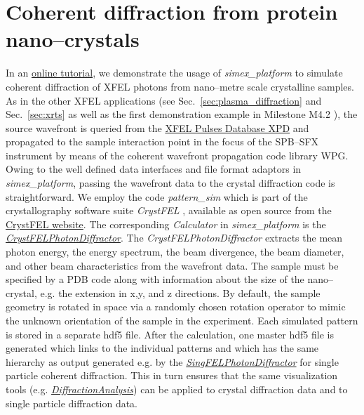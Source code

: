 \documentclass[10pt]{scrartcl}
\begin{document}
\section{Coherent diffraction from protein nano--crystals\label{sec:protein_sfx}}
In an
\href{https://github.com/eucall-software/simex_platform/wiki/Tutorial-on-nano-crystal-diffraction}{online
tutorial}, we demonstrate the usage of \textit{simex\_platform} to simulate
coherent diffraction of XFEL photons from nano--metre scale crystalline samples.
As in the other XFEL applications (see Sec.~\ref{sec:plasma_diffraction} and
Sec.~\ref{sec:xrts} as well as the first demonstration example in Milestone
M4.2 \cite{EUCALL_SIMEX_M4.2}), the source wavefront is queried from the
\href{https://in.xfel.eu/xpd}{XFEL Pulses Database XPD} and propagated to the
sample interaction point in the focus of the SPB--SFX instrument by means of
the coherent wavefront propagation code library WPG. Owing to the well defined
data interfaces and file format adaptors in \textit{simex\_platform}, passing the
wavefront data to the crystal diffraction code is straightforward. We employ the
code \textit{pattern\_sim} which is part of the crystallography software suite
\textit{CrystFEL} \cite{White2012}, available as open source from the
\href{https://www.desy.de/~twhite/crystfel}{CrystFEL website}. The
corresponding \textit{Calculator} in \textit{simex\_platform} is the
\href{https://eucall-software.github.io/simex_platform/#SimEx.Calculators.CrystFELPhotonDiffractor.CrystFELPhotonDiffractor}{\textit{CrystFELPhotonDiffractor}}.
The \textit{CrystFELPhotonDiffractor} extracts the mean photon energy, the energy
spectrum, the beam divergence, the beam diameter, and other beam characteristics
from the wavefront data. The sample must be specified by a PDB code along
with information about the size of the nano--crystal, e.g. the extension in x,y,
and z directions. By default, the sample geometry is rotated in space via a
randomly chosen rotation operator to mimic the unknown orientation of the sample
in the experiment. Each simulated pattern is stored in a separate hdf5 file.
After the calculation, one master hdf5 file is generated which links to the
individual patterns and which has the same hierarchy as output generated e.g. by
the
\href{https://eucall-software.github.io/simex_platform/#SimEx.Calculators.SingFELPhotonDiffractor.SingFELPhotonDiffractor}{\textit{SingFELPhotonDiffractor}}
for single particle coherent diffraction. This in turn ensures that the same
visualization tools (e.g.
\href{https://eucall-software.github.io/simex_platform/#SimEx.Analysis.DiffractionAnalysis.DiffractionAnalysis}{\textit{DiffractionAnalysis}})
can be applied to crystal diffraction data and to single particle diffraction
data.
%
\end{document}
